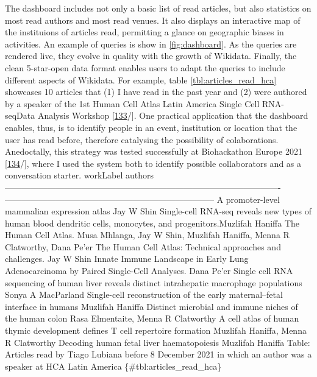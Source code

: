 The dashboard includes not only a basic list of read articles, but also statistics on most read authors and most read venues.
It also displays an interactive map of the instituions of articles read, permitting a glance on geographic biases in activities.
An example of queries is show in \ref{fig:dashboard}.
As the queries are rendered live, they evolve in quality with the growth of Wikidata.
Finally, the clean 5-star-open data format enables users to adapt the queries to include different aspects of Wikidata.
For example, table \ref{tbl:articles_read_hca} showcases 10 articles that (1) I have read in the past year and (2) were authored by a speaker of the 1st Human Cell Atlas Latin America Single Cell RNA-seqData Analysis Workshop {[}\protect\hyperlink{ref-1hag8XE6}{133}/{]}.
One practical application that the dashboard enables, thus, is to identify people in an event, institution or location that the user has read before, therefore catalysing the possibility of colaborations.
Anedoctally, this strategy was tested successfully at Biohackathon Europe 2021 {[}\protect\hyperlink{ref-kHL3NVxk}{134}/{]}, where I used the system both to identify possible collaborators and as a conversation starter.
\textbar workLabel \textbar authors \textbar{}
\textbar-------------------------------------------------------------------------------------------------\textbar--------------------------------------------------------------------------\textbar{}
\textbar A promoter-level mammalian expression atlas \textbar Jay W Shin \textbar{}
\textbar Single-cell RNA-seq reveals new types of human blood dendritic cells, monocytes, and progenitors.\textbar Muzlifah Haniffa \textbar{}
\textbar The Human Cell Atlas. \textbar Musa Mhlanga, Jay W Shin, Muzlifah Haniffa, Menna R Clatworthy, Dana Pe'er\textbar{}
\textbar The Human Cell Atlas: Technical approaches and challenges. \textbar Jay W Shin \textbar{}
\textbar Innate Immune Landscape in Early Lung Adenocarcinoma by Paired Single-Cell Analyses. \textbar Dana Pe'er \textbar{}
\textbar Single cell RNA sequencing of human liver reveals distinct intrahepatic macrophage populations \textbar Sonya A MacParland \textbar{}
\textbar Single-cell reconstruction of the early maternal--fetal interface in humans \textbar Muzlifah Haniffa \textbar{}
\textbar Distinct microbial and immune niches of the human colon \textbar Rasa Elmentaite, Menna R Clatworthy \textbar{}
\textbar A cell atlas of human thymic development defines T cell repertoire formation \textbar Muzlifah Haniffa, Menna R Clatworthy \textbar{}
\textbar Decoding human fetal liver haematopoiesis \textbar Muzlifah Haniffa \textbar{}
Table: Articles read by Tiago Lubiana before 8 December 2021 in which an author was a speaker at HCA Latin America
\{\#tbl:articles\_read\_hca\} \textbar{}

